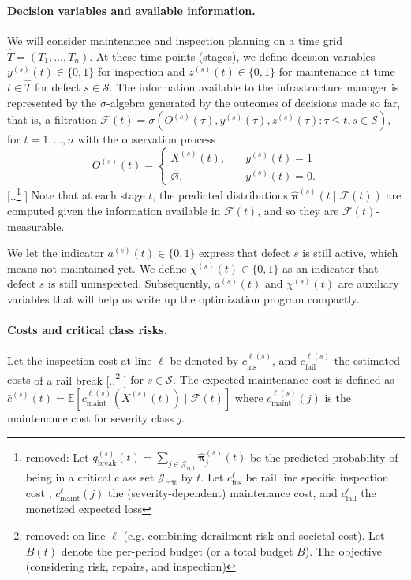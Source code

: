 \documentclass{article}
\providecommand{\DIFadd}[1]{{\protect\color{blue} \sf #1}} %
\providecommand{\DIFdel}[1]{{\protect\color{red} [..\footnote{removed: #1} ]}} %
\providecommand{\DIFaddbegin}{} %
\providecommand{\DIFaddend}{} %
\providecommand{\DIFdelbegin}{} %
\providecommand{\DIFdelend}{} %
\begin{document}
\paragraph{\DIFadd{Decision variables and available information.}}
\DIFadd{We will consider maintenance and inspection planning on a time grid $\widehat T=(T_1,\dots,T_n)$.
At these time points (stages), we define decision variables 
$y^{(s)}(t)\in\{0,1\}$ for inspection and $z^{(s)}(t)\in\{0,1\}$ for maintenance at time $t \in \widehat T$ for defect $s\in\mathcal S$.
The information available to the infrastructure manager is represented by the $\sigma$-algebra generated by the outcomes of decisions made so far, that is, a filtration
$
\mathcal F(t) = \sigma \left( O^{(s)}(\tau), y^{(s)}(\tau), z^{(s)}(\tau) : \tau \leq t, s\in\mathcal S \right), 
$
for $t = 1, \dots, n$ with the observation process 
}$$
O^{(s)}(t) = \begin{cases}
X^{(s)}(t), \quad &y^{(s)}(t) = 1\\ 
\varnothing, \quad &y^{(s)}(t) = 0.
\end{cases}
$$\DIFaddend 
\DIFdelbegin \DIFdel{Let $q^{(s)}_{\mathrm{break}}(t)=\sum_{j\in\mathcal{J}_{\mathrm{crit}}}\widehat{\bm\pi}^{(s)}_j(t)$ be the predicted probability of being in a critical class set $\mathcal{J}_{\mathrm{crit}}$ by $t$.
Let $c_{\mathrm{ins}}^{\ell}$ be rail line specific inspection cost , $c_{\mathrm{maint}}^{\ell}(j)$ the (severity-dependent) maintenance cost, and $c_{\mathrm{fail}}^{\ell}$ the monetized expected loss }\DIFdelend \DIFaddbegin \DIFadd{Note that at each stage $t$, the predicted distributions $\widehat{\bm \pi}^{(s)}(t \mid \mathcal F(t))$ are computed given the information available in $\mathcal F(t)$, and so they are $\mathcal F(t)$-measurable.
}

\DIFadd{We let the indicator \(a^{(s)}(t)\in\{0,1\}\) express that defect \(s\) is still active, which means not maintained yet. We define \(\chi^{(s)}(t)\in\{0,1\}\) as an indicator that defect \(s\) is still uninspected. Subsequently, $a^{(s)}(t)$ and $\chi^{(s)}(t)$ are auxiliary variables that will help us write up the optimization program compactly.
}


\paragraph{\DIFadd{Costs and critical class risks.}}
\DIFadd{Let the inspection cost at line $\ell$ be denoted by $c_{\text{ins}}^{\ell(s)}$, and $c_{\text{fail}}^{\ell(s)}$ the estimated costs }\DIFaddend of a rail break \DIFdelbegin \DIFdel{on line $\ell$ (e.g. combining derailment risk and societal cost).
Let $B(t)$ denote the per-period budget (or a total budget $B$).
The objective (considering risk, repairs, and inspection) }\DIFdelend \DIFaddbegin \DIFadd{for $s \in \mathcal S$.
The expected maintenance cost is defined as 
$
\bar c^{(s)}(t) = \mathds E \left[ c_{\text{maint}}^{\ell(s)} \left(X^{(s)}(t)\right) \mid \mathcal F(t) \right]
$ where $c^{\ell(s)}_{\text{maint}}(j)$ is the maintenance cost for severity class $j$.
}
\end{document}
